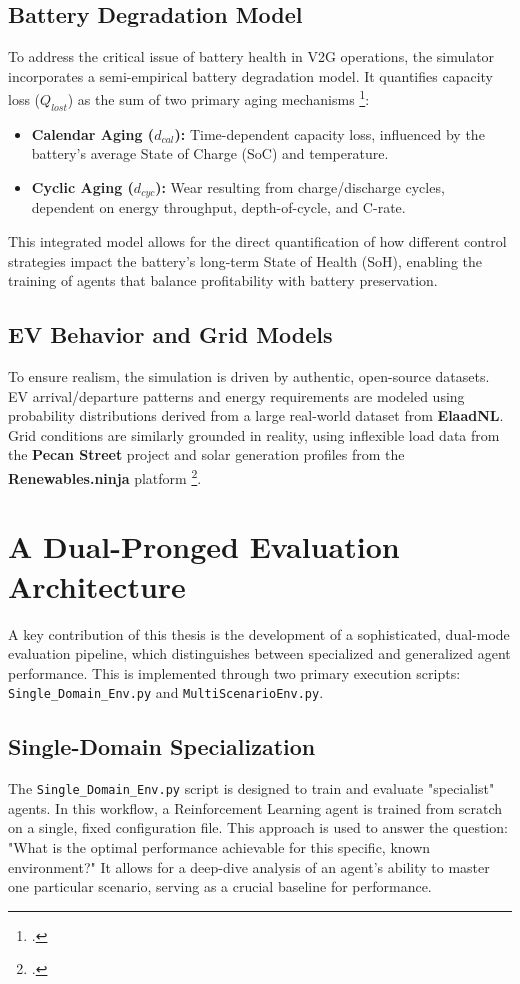 \subsection{Battery Degradation Model}
To address the critical issue of battery health in V2G operations, the simulator incorporates a semi-empirical battery degradation model. It quantifies capacity loss ($Q_{lost}$) as the sum of two primary aging mechanisms \footcite{orfanoudakis2024ev2gym}:
\begin{itemize}
    \item \textbf{Calendar Aging ($d_{cal}$):} Time-dependent capacity loss, influenced by the battery's average State of Charge (SoC) and temperature.
    \item \textbf{Cyclic Aging ($d_{cyc}$):} Wear resulting from charge/discharge cycles, dependent on energy throughput, depth-of-cycle, and C-rate.
\end{itemize}
This integrated model allows for the direct quantification of how different control strategies impact the battery's long-term State of Health (SoH), enabling the training of agents that balance profitability with battery preservation.

\subsection{EV Behavior and Grid Models}
To ensure realism, the simulation is driven by authentic, open-source datasets. EV arrival/departure patterns and energy requirements are modeled using probability distributions derived from a large real-world dataset from \textbf{ElaadNL}. Grid conditions are similarly grounded in reality, using inflexible load data from the \textbf{Pecan Street} project and solar generation profiles from the \textbf{Renewables.ninja} platform \footcite{orfanoudakis2024ev2gym}.

\section{A Dual-Pronged Evaluation Architecture}
A key contribution of this thesis is the development of a sophisticated, dual-mode evaluation pipeline, which distinguishes between specialized and generalized agent performance. This is implemented through two primary execution scripts: \texttt{Single\_Domain\_Env.py} and \texttt{MultiScenarioEnv.py}.

\subsection{Single-Domain Specialization}
The \texttt{Single\_Domain\_Env.py} script is designed to train and evaluate "specialist" agents. In this workflow, a Reinforcement Learning agent is trained from scratch on a single, fixed configuration file. This approach is used to answer the question: "What is the optimal performance achievable for this specific, known environment?" It allows for a deep-dive analysis of an agent's ability to master one particular scenario, serving as a crucial baseline for performance.

